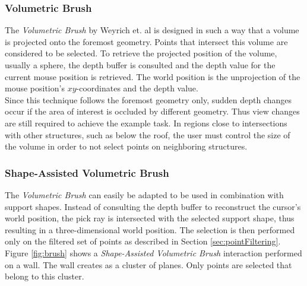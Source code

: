 \subsubsection{Volumetric Brush}

The \textit{Volumetric Brush} by Weyrich et. al\cite{weyrich2004post} is designed in such a way that a volume is projected onto the foremost geometry. Points that intersect this volume are considered to be selected. To retrieve the projected position of the volume, usually a sphere, the depth buffer is consulted and the depth value for the current mouse position is retrieved. The world position is the unprojection of the mouse position's $xy$-coordinates and the depth value. 
\\
Since this technique follows the foremost geometry only, sudden depth changes occur if the area of interest is occluded by different geometry. Thus view changes are still required to achieve the example task. In regions close to intersections with other structures, such as below the roof, the user must control the size of the volume in order to not select points on neighboring structures. 


\subsubsection{Shape-Assisted Volumetric Brush}

The \textit{Volumetric Brush} can easily be adapted to be used in combination with support shapes. Instead of consulting the depth buffer to reconstruct the cursor’s world position, the pick ray is intersected with the selected support shape, thus resulting in a three-dimensional world position. The selection is then performed only on the filtered set of points as described in Section \ref{sec:pointFiltering}. 
Figure \ref{fig:brush} shows a \textit{Shape-Assisted Volumetric Brush} interaction performed on a wall. The wall creates as a cluster of planes. Only points are selected that belong to this cluster. 

